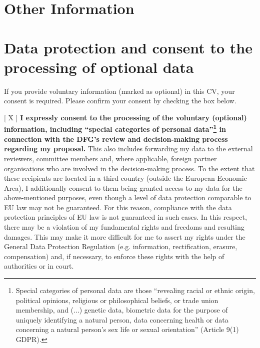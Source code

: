\documentclass[english]{dfgcv}
\begin{document}


\section{Other Information}



\section{Data protection and consent to the processing of optional data}
If you provide voluntary information (marked as optional) in this CV, your consent is required. Please confirm your consent by checking the box below.

[ X ]
\textbf{I expressly consent to the processing of the voluntary (optional) information, including \enquote{special categories of personal data}\footnote{Special categories of personal data are those \enquote{revealing racial or ethnic origin, political opinions, religious or philosophical beliefs, or trade union membership, and (...) genetic data, biometric data for the purpose of uniquely identifying a natural person, data concerning health or data concerning a natural person's sex life or sexual orientation} (Article 9(1) GDPR).} in connection with the DFG's review and decision-making process regarding my proposal.}
This also includes forwarding my data to the external reviewers, committee members and, where applicable, foreign partner organisations who are involved in the decision-making process. To the extent that these recipients are located in a third country (outside the European Economic Area), I additionally consent to them being granted access to my data for the above-mentioned purposes, even though a level of data protection comparable to EU law may not be guaranteed. For this reason, compliance with the data protection principles of EU law is not guaranteed in such cases. In this respect, there may be a violation of my fundamental rights and freedoms and resulting damages. This may make it more difficult for me to assert my rights under the General Data Protection Regulation (e.g. information, rectification, erasure, compensation) and, if necessary, to enforce these rights with the help of authorities or in court.
\end{document}
